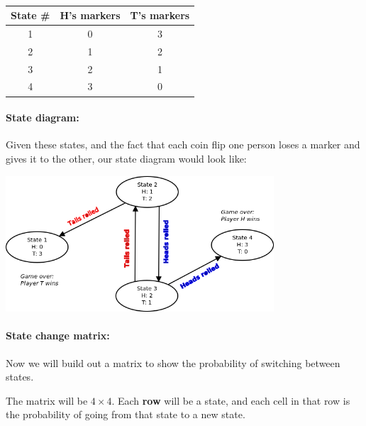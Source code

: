 \documentclass[a4paper,12pt]{book}
\begin{document}
{\begin{intro}{\ }
             \begin{center}
                 \begin{tabular}{c c c}
                     State \# & H's markers & T's markers \\ \hline
                     1 & 0 & 3 \\
                     2 & 1 & 2 \\
                     3 & 2 & 1 \\
                     4 & 3 & 0
                 \end{tabular}
             \end{center}

            \paragraph{State diagram:}  Given these states,
            and the fact that each coin flip one person loses a marker
            and gives it to the other, our state diagram
            would look like:
            
            \begin{center}
                \includegraphics[width=10cm]{images/6-6-states.png}
            \end{center}

            \paragraph{State change matrix:} Now we will build out
            a matrix to show the probability of switching between states.

            The matrix will be $4 \times 4$. Each \textbf{row} will be
            a state, and each cell in that row is the probability of going
            from that state to a new state.


\end{intro}}
\end{document}
